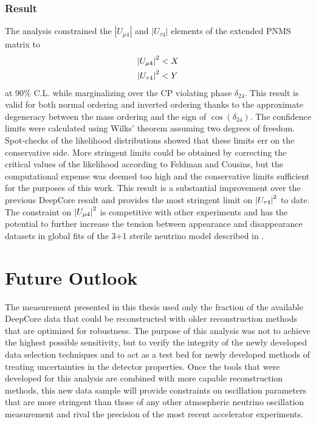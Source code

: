 \subsubsection{Result}
The analysis constrained the $|U_{\mu4}|$ and $|U_{\tau4}|$ elements of the extended PNMS matrix to
\begin{equation}
    \begin{aligned}
        \abs{U_{\mu4}}^2 &< X \\
        \abs{U_{\tau4}}^2 &< Y \\
    \end{aligned}
\end{equation}
at 90\% C.L. while marginalizing over the CP violating phase $\delta_{24}$. This result is valid for both normal ordering and inverted ordering thanks to the approximate degeneracy between the mass ordering and the sign of $\cos(\delta_{24})$. The confidence limits were calculated using Wilks' theorem assuming two degrees of freedom. Spot-checks of the likelihood distributions showed that these limits err on the conservative side. More stringent limits could be obtained by correcting the critical values of the likelihood according to Feldman and Cousins\cite{Feldman_1998}, but the computational expense was deemed too high and the conservative limits sufficient for the purposes of this work. This result is a substantial improvement over the previous DeepCore result and provides the most stringent limit on $\abs{U_{\tau4}}^2$ to date. The constraint on $\abs{U_{\mu4}}^2$ is competitive with other experiments and has the potential to further increase the tension between appearance and disappearance datasets in global fits of the 3+1 sterile neutrino model described in .

\section{Future Outlook}

The measurement presented in this thesis used only the fraction of the available DeepCore data that could be reconstructed with older reconstruction methods that are optimized for robustness. The purpose of this analysis was not to achieve the highest possible sensitivity, but to verify the integrity of the newly developed data selection techniques and to act as a test bed for newly developed methods of treating uncertainties in the detector properties. Once the tools that were developed for this analysis are combined with more capable reconstruction methods, this new data sample will provide constraints on oscillation parameters that are more stringent than those of any other atmospheric neutrino oscillation measurement and rival the precision of the most recent accelerator experiments.

